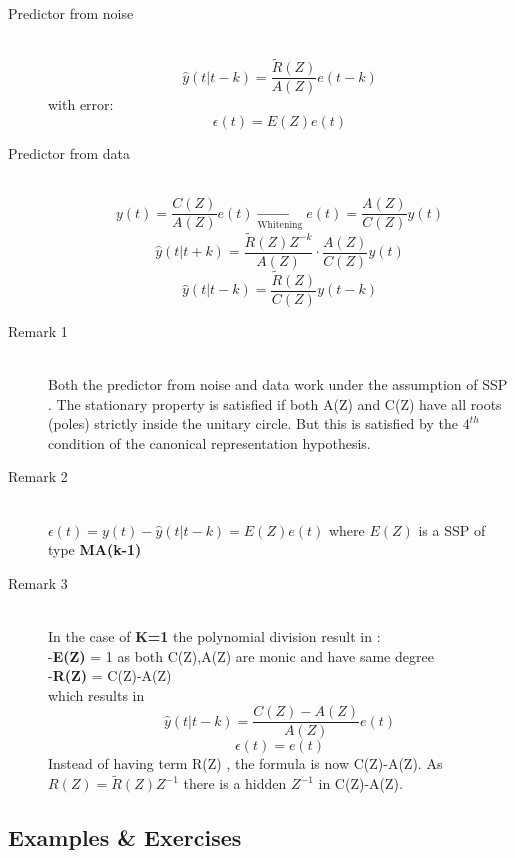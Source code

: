 \begin{description}
\item[Predictor from noise]\hfill\\
\[
\boxed{\hat{y}(t|t-k) = \frac{\tilde{R}(Z)}{A(Z)}e(t-k)}
\]
with error:
\[
\boxed{\epsilon(t) = E(Z)e(t)}
\]
\item[Predictor from data]\hfill\\
$$ y(t) =\frac{C(Z)}{A(Z)}e(t) \xrightarrow[\text{Whitening}]{}e(t) = \frac{A(Z)}{C(Z)}y(t)$$
$$ \hat{y}(t|t+k) = \frac{\tilde{R}(Z)Z^{-k}}{A(Z)} \cdot \frac{A(Z)}{C(Z)}y(t)$$
\[
\boxed{\hat{y}(t|t-k) = \frac{\tilde{R}(Z)}{C(Z)}y(t-k)}
\]
\item[Remark 1]\hfill\\
Both the predictor from noise and data work under the assumption of SSP . The stationary property is satisfied if both A(Z) and C(Z) have all roots (poles) strictly inside the unitary circle. But this is satisfied by the $4^{th}$ condition of the canonical representation hypothesis.
\item[Remark 2]\hfill\\
$\epsilon(t) = y(t)- \hat{y}(t|t-k)=E(Z)e(t)$ where $E(Z)$ is a SSP of type \textbf{MA(k-1)}
\item[Remark 3]\hfill\\
In the case of \textbf{K=1} the polynomial division result in :\\
-\textbf{E(Z)} = 1 as both C(Z),A(Z) are monic and have same degree\\
-\textbf{R(Z)} = C(Z)-A(Z)\\
which results in 
\[
\boxed{\hat{y}(t|t-k)=\frac{C(Z)-A(Z)}{A(Z)}e(t)}
\]
\[
\boxed{\epsilon(t)=e(t)}
\]
Instead of having term R(Z) , the formula is now C(Z)-A(Z). As $R(Z)= \tilde{R}(Z)Z^{-1}$ there is a hidden $Z^{-1}$ in C(Z)-A(Z).
\end{description}

\subsection{Examples \& Exercises}

